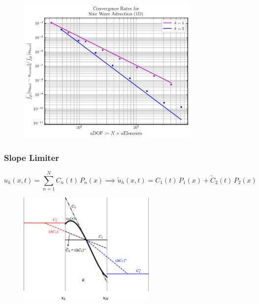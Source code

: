 \documentclass{beamer}
\begin{document}
\begin{frame}

  \begin{figure}[htb!]
    \centering
    \includegraphics[width=0.8\textwidth]{fig.ConvergenceRates.png}
  \end{figure}

\end{frame}

\begin{frame}
\frametitle{Slope Limiter}

  \Fontvi
  \begin{equation*}
  u_{h}\left(x,t\right)
  =\sum\limits_{n=1}^{N}
  C_{n}\left(t\right)\,P_{n}\left(x\right)\implies
  \tilde{u}_{h}\left(x,t\right)
  =C_{1}\left(t\right)\,P_{1}\left(x\right)
  +\tilde{C}_{2}\left(t\right)\,P_{2}\left(x\right)
  \end{equation*}

  \begin{figure}[htb!]
    \centering
    \includegraphics[width=0.6\textwidth]{fig.MinMod.jpeg}
  \end{figure}

\end{frame}
\end{document}
